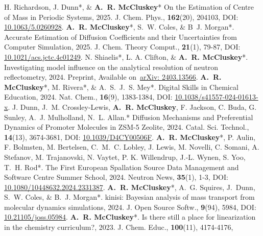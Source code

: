 \begin{benumerate}{23}
   \cvpuby
    {H. Richardson, J. Dunn*, \& \textbf{A.~R. McCluskey}*}
    {On the Estimation of Centre of Mass in Periodic Systems,}
    {2025.}
    {J. Chem. Phys.,}
    {\textbf{162}(20), 204103,}
    {DOI: \href{https://doi.org/10.1063/5.0260928}{10.1063/5.0260928}.}
   \cvpuby
    {\textbf{A.~R. McCluskey}*, S.~W. Coles, \& B~J. Morgan*.}
    {Accurate Estimation of Diffusion Coefficients and their Uncertainties from Computer Simulation,}
    {2025.}
    {J. Chem. Theory Comput.,}
    {\textbf{21}(1), 79-87,}
    {DOI: \href{https://doi.org/10.1021/acs.jctc.4c01249}{10.1021/acs.jctc.4c01249}.}
  \cvpuby
    {N. Shiaelis*, L. A. Clifton, \& \textbf{A.~R. McCluskey}*.}
    {Investigating model influence on the analytical resolution of neutron reflectometry,}
    {2024.}
    {Preprint,}
    {}
    {Available on~\href{https://arxiv.org/abs/2403.13566}{arXiv: 2403.13566}.}
  \cvpuby
    {\textbf{A.~R. McCluskey}*, M. Rivera*, \& A.~S.~J.~S. Mey*.}
    {Digital Skills in Chemical Education,}
    {2024.}
    {Nat. Chem.,}
    {\textbf{16}(9), 1383-1384,}
    {DOI: \href{https://doi.org/10.1038/s41557-024-01613-x}{10.1038/s41557-024-01613-x}.}
  \cvpuby
    {J. Dunn, J.~M. Crossley-Lewis, \textbf{A.~R. McCluskey}, F. Jackson, C. Buda, G. Sunley, A.~J. Mulholland, N.~L. Allan.*}
    {Diffusion Mechanisms and Preferential Dynamics of Promoter Molecules in ZSM-5 Zeolite,}
    {2024.}
    {Catal. Sci. Technol.,}
    {\textbf{14}(13), 3674-3681,}
    {DOI: \href{https://doi.org/10.1039/D4CY00506F}{10.1039/D4CY00506F}.}
  \cvpuby
    {\textbf{A.~R. McCluskey}*, P. Aulin, F. Bolmsten, M. Bertelsen, C.~M.~C. Lobley, J. Lewis, M. Novelli, C. Somani, A. Stefanov, M. Trajanovski, N. Vaytet, P. K. Willendrup, J.-L. Wynen, S. Yoo, T.~H. Rod*.}
    {The First European Spallation Source Data Management and Software Centre Summer School,}
    {2024.}
    {Neutron News,}
    {\textbf{35}(1), 1-3,}
    {DOI: \href{https://doi.org/10.1080/10448632.2024.2331387}{10.1080/10448632.2024.2331387}.}
  \cvpuby
    {\textbf{A.~R. McCluskey}*, A.~G. Squires, J.~Dunn, S.~W. Coles, \& B.~J. Morgan*.}
    {kinisi: Bayesian analysis of mass transport from molecular dynamics simulations,}
    {2024.}
    {J. Open Source Softw.,}
    {\textbf{9}(94), 5984,}
    {DOI: \href{https://doi.org/10.21105/joss.05984}{10.21105/joss.05984}.}
   \cvpuby
    {\textbf{A.~R. McCluskey}*.}
    {Is there still a place for linearization in the chemistry curriculum?,}
    {2023.}
    {J. Chem. Educ.,}
    {\textbf{100}(11), 4174-4176,}

\end{benumerate}

